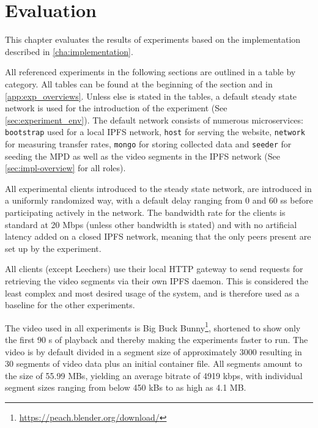 \chapter{Evaluation}
\label{cha:evaluation}
This chapter evaluates the results of experiments based on the implementation described in \autoref{cha:implementation}.

All referenced experiments in the following sections are outlined in a table by category. All tables can be found at the beginning of the section and in \autoref{app:exp_overviews}. Unless else is stated in the tables, a default steady state network is used for the introduction of the experiment (See \autoref{sec:experiment_env}). The default network consists of numerous microservices: \texttt{bootstrap} used for a local \ac{IPFS} network, \texttt{host} for serving the website, \texttt{network} for measuring transfer rates, \texttt{mongo} for storing collected data and \texttt{seeder} for seeding the \ac{MPD} as well as the video segments in the \ac{IPFS} network (See \autoref{sec:impl-overview} for all roles).

All experimental clients introduced to the steady state network, are introduced in a uniformly randomized way, with a default delay ranging from 0 and 60 \acp{s} before participating actively in the network.
The bandwidth rate for the clients is standard at 20 \ac{Mbps} (unless other bandwidth is stated) and with no artificial latency added on a closed \ac{IPFS} network, meaning that the only peers present are set up by the experiment.

All clients (except Leechers) use their local \ac{HTTP} gateway to send requests for retrieving the video segments via their own \ac{IPFS} daemon. This is considered the least complex and most desired usage of the system, and is therefore used as a baseline for the other experiments.

The video used in all experiments is Big Buck Bunny\footnote{\url{https://peach.blender.org/download/}}, shortened to show only the first 90 \ac{s} of playback and thereby making the experiments faster to run. The video is by default divided in a segment size of approximately 3000  resulting in 30 segments of video data plus an initial container file. All segments amount to the size of 55.99 \acp{MB}, yielding an average bitrate of 4919 \ac{kbps}, with individual segment sizes ranging from below 450 \acp{kB} to as high as 4.1 \ac{MB}.


